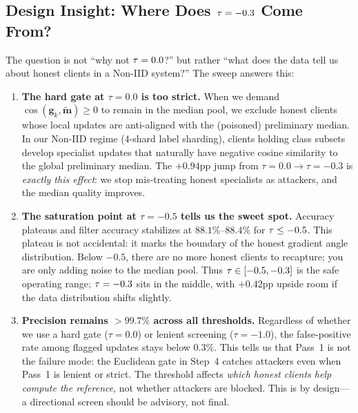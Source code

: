 \documentclass[../main]{subfiles}
\begin{document}
\subsection{Design Insight: Where Does \texorpdfstring{$\tau = -0.3$}{tau\_cos = -0.3} Come From?}
\label{app:cos_sweep_obs}

The question is not ``why not $\tau = 0.0$?'' but rather ``what does the data tell us about honest clients
in a Non-IID system?'' The sweep answers this:

\begin{enumerate}
    \item \textbf{The hard gate at $\tau=0.0$ is too strict.}
    When we demand $\cos(\mathbf{g}_k, \tilde{\mathbf{m}}) \geq 0$ to remain in the median pool, we exclude honest clients
    whose local updates are anti-aligned with the (poisoned) preliminary median.
    In our Non-IID regime (4-shard label sharding), clients holding class subsets develop specialist updates
    that naturally have negative cosine similarity to the global preliminary median.
    The $+0.94$pp jump from $\tau=0.0 \to \tau=-0.3$ is \emph{exactly this effect}: we stop mis-treating honest specialists
    as attackers, and the median quality improves.

    \item \textbf{The saturation point at $\tau = -0.5$ tells us the sweet spot.}
    Accuracy plateaus and filter accuracy stabilizes at $88.1\%$--$88.4\%$ for $\tau \leq -0.5$. This plateau
    is not accidental: it marks the boundary of the honest gradient angle distribution. Below $-0.5$, there are no more
    honest clients to recapture; you are only adding noise to the median pool.
    Thus $\tau \in [-0.5, -0.3]$ is the safe operating range; $\tau=-0.3$ sits in the middle, with $+0.42$pp
    upside room if the data distribution shifts slightly.

    \item \textbf{Precision remains $>99.7\%$ across all thresholds.}
    Regardless of whether we use a hard gate ($\tau=0.0$) or lenient screening ($\tau=-1.0$), the false-positive rate
    among flagged updates stays below $0.3\%$.
    This tells us that Pass~1 is not the failure mode: the Euclidean gate in Step~4 catches attackers even when Pass~1
    is lenient or strict. The threshold affects \emph{which honest clients help compute the reference}, not whether
    attackers are blocked. This is by design---a directional screen should be advisory, not final.
\end{enumerate}
\end{document}
